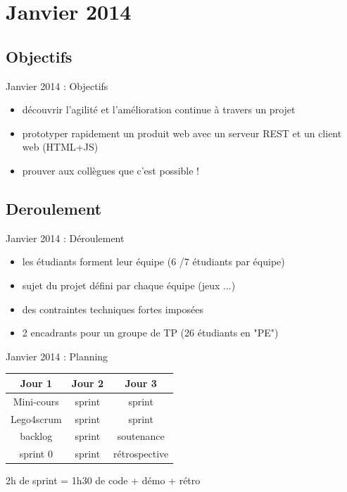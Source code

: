 \documentclass{beamer}
\begin{document}
\section{Janvier 2014}
\subsection{Objectifs}
\begin{frame}{Janvier 2014 : Objectifs}

  \begin{itemize}
    \item découvrir l'agilité et l'amélioration continue à travers un projet 
    \item prototyper rapidement un produit web avec un serveur REST et un client web (HTML+JS)
    \item prouver aux collègues que c'est possible !
  \end{itemize}
\end{frame}

\subsection{Deroulement}
\begin{frame}{Janvier 2014 : Déroulement}
  \begin{itemize}
    \item les étudiants forment leur équipe (6 /7 étudiants par équipe)
    \item sujet du projet défini par chaque équipe (jeux ...)
    \item des contraintes techniques fortes imposées
    \item 2 encadrants pour un groupe de TP (26 étudiants en "PE")
  \end{itemize}
\end{frame}

\begin{frame}{Janvier 2014 : Planning}
  \begin{center}
    \begin{tabular}{| c | c | c |}
      \hline
      \textbf{Jour 1} & \textbf{Jour 2} & \textbf{Jour 3} \\
      \hline \hline
      Mini-cours & sprint & sprint        \\
      \hline
      Lego4scrum    & sprint & sprint        \\
      \hline \hline
      backlog    & sprint & soutenance    \\
      \hline
      sprint 0   & sprint & rétrospective \\
      \hline
    \end{tabular}
  \end{center}
  2h de sprint = 1h30 de code + démo + rétro
\end{frame}
\end{document}
